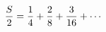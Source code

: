 \documentclass[preview]{standalone}
\begin{document}
\begin{align*}
\special{dvisvgm:raw <g id='unique000'>}\dfrac{S}{2}=\dfrac{1}{4}+\dfrac{2}{8}+\dfrac{3}{16}+\cdots\special{dvisvgm:raw </g>}
\end{align*}
\end{document}
